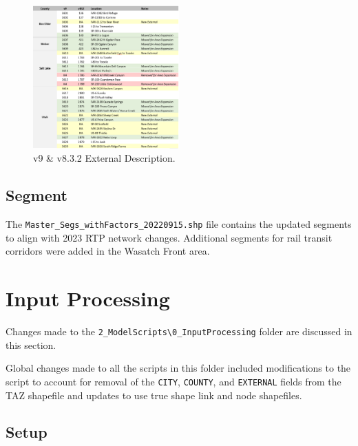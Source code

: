 \documentclass[
  letterpaper,
  DIV=11,
  numbers=noendperiod]{scrreprt}
\begin{document}
\begin{figure}[H]

{\centering \includegraphics[width=0.5\textwidth,height=\textheight]{v9x/v900/whats-new/_pictures/ex_descrip3.png}

}

\caption{\label{fig-descrip3}v9 \& v8.3.2 External Description.}

\end{figure}

\hypertarget{segment}{%
\section{Segment}\label{segment}}

The \texttt{Master\_Segs\_withFactors\_20220915.shp} file contains the
updated segments to align with 2023 RTP network changes. Additional
segments for rail transit corridors were added in the Wasatch Front
area.


\hypertarget{input-processing}{%
\chapter{Input Processing}\label{input-processing}}

Changes made to the
\texttt{2\_ModelScripts\textbackslash{}0\_InputProcessing} folder are
discussed in this section.

Global changes made to all the scripts in this folder included
modifications to the script to account for removal of the \texttt{CITY},
\texttt{COUNTY}, and \texttt{EXTERNAL} fields from the TAZ shapefile and
updates to use true shape link and node shapefiles.

\hypertarget{setup}{%
\section{Setup}\label{setup}}
\end{document}
